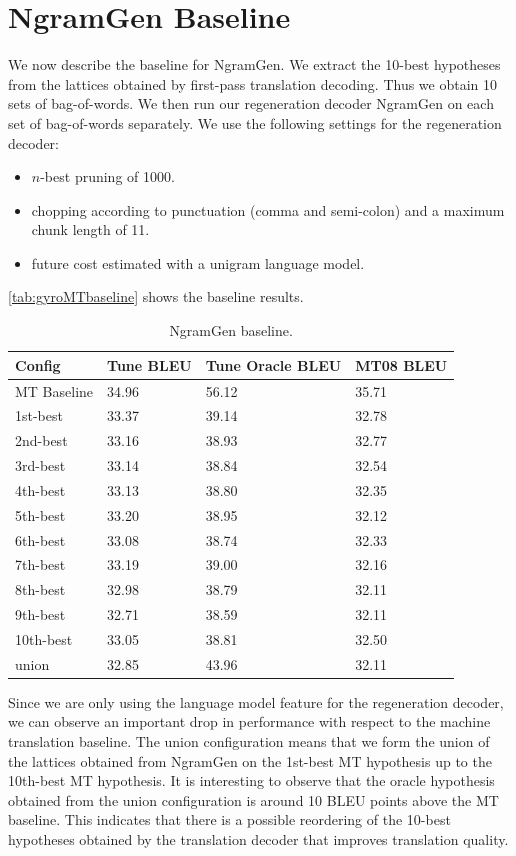 
\section{NgramGen Baseline}
\label{sec:gyroTransBaseline}


We now describe the baseline for NgramGen.
We extract the 10-best hypotheses from the lattices
obtained by first-pass translation decoding. Thus we obtain
10 sets of bag-of-words. We then run our regeneration decoder
NgramGen on each
set of bag-of-words separately.
We use the following settings for the regeneration decoder:
%
\begin{itemize}
  \item $n$-best pruning of 1000.
  \item chopping according to punctuation (comma and semi-colon) and a maximum chunk
    length of 11.
  \item future cost estimated with a unigram language model.
\end{itemize}
%
\autoref{tab:gyroMTbaseline} shows the baseline results.
%
\begin{table}
  \begin{center}
    \begin{tabular}{l|l|l|l}
      Config & Tune BLEU & Tune Oracle BLEU & MT08 BLEU \\
      \hline
      MT Baseline & 34.96 & 56.12 & 35.71 \\
      \hline
      1st-best & 33.37 & 39.14 & 32.78 \\
      2nd-best & 33.16 & 38.93 & 32.77 \\
      3rd-best & 33.14 & 38.84 & 32.54 \\
      4th-best & 33.13 & 38.80 & 32.35 \\
      5th-best & 33.20 & 38.95 & 32.12 \\
      6th-best & 33.08 & 38.74 & 32.33 \\
      7th-best & 33.19 & 39.00 & 32.16 \\
      8th-best & 32.98 & 38.79 & 32.11 \\
      9th-best & 32.71 & 38.59 & 32.11 \\
      10th-best & 33.05 & 38.81 & 32.50 \\
      union & 32.85 & 43.96 & 32.11 \\
    \end{tabular}
  \end{center}
  \caption{NgramGen baseline.}
  \label{tab:gyroMTbaseline}
\end{table}
%
Since we are only using the language model feature for the regeneration
decoder, we can observe an important drop in performance with respect
to the machine translation baseline. The union configuration means
that we form the union of the lattices obtained from NgramGen on
the 1st-best MT hypothesis up to the 10th-best MT hypothesis.
It is interesting to observe that
the oracle hypothesis obtained from the union configuration is
around 10 BLEU points above the MT baseline. This indicates that
there is a possible reordering of the 10-best hypotheses obtained by
the translation decoder that improves translation quality.

